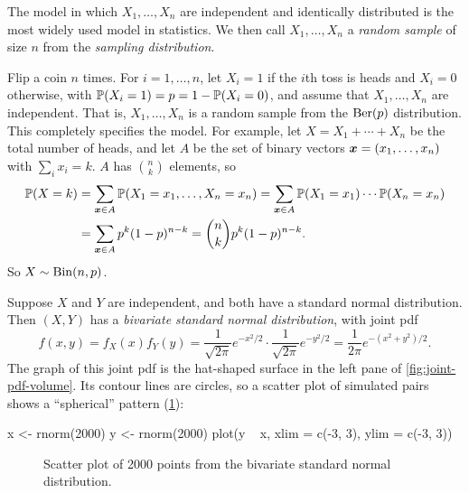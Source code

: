 \begin{remark}\label{rem:random-sample}
The model in which $X_1, \ldots, X_n$ are independent and identically distributed is the most widely used model in statistics. We then call $X_1, \ldots, X_n$ a \emph{random sample} of size $n$ from the \emph{sampling distribution}.
\end{remark}

\begin{example}\label{ex:coin-flips-independent}
Flip a coin $n$ times. For $i = 1, \ldots, n$, let $X_i = 1$ if the $i$th toss is heads and $X_i = 0$ otherwise, with $\mathbb{P}(X_i = 1) = p = 1 - \mathbb{P}(X_i = 0)$, and assume that $X_1, \ldots, X_n$ are independent. That is, $X_1, \ldots, X_n$ is a random sample from the $\mathrm{Ber}(p)$ distribution. This completely specifies the model. For example, let $X = X_1 + \cdots + X_n$ be the total number of heads, and let $A$ be the set of binary vectors $\bm{x} = (x_1, \ldots, x_n)$ with $\sum_i x_i = k$. $A$ has $\binom{n}{k}$ elements, so
\begin{align*}
  \mathbb{P}(X = k) &= \sum_{\bm{x} \in A} \mathbb{P}(X_1 = x_1, \ldots, X_n = x_n) = \sum_{\bm{x} \in A} \mathbb{P}(X_1 = x_1) \cdots \mathbb{P}(X_n = x_n) \\
  &= \sum_{\bm{x} \in A} p^k (1-p)^{n-k} = \binom{n}{k} p^k (1-p)^{n-k}.
\end{align*}
So $X \sim \mathrm{Bin}(n, p)$.
\end{example}

\begin{example}\label{ex:bivariate-standard-normal}
Suppose $X$ and $Y$ are independent, and both have a standard normal distribution. Then $(X, Y)$ has a \emph{bivariate standard normal distribution}, with joint pdf
\[
  f(x, y) = f_X(x) f_Y(y) = \frac{1}{\sqrt{2\pi}} e^{-x^2/2} \cdot \frac{1}{\sqrt{2\pi}} e^{-y^2/2} = \frac{1}{2\pi} e^{-(x^2 + y^2)/2}.
\]
The graph of this joint pdf is the hat-shaped surface in the left pane of \cref{fig:joint-pdf-volume}. Its contour lines are circles, so a scatter plot of simulated pairs shows a ``spherical'' pattern (\cref{fig:bivariate-normal-scatter}):
\begin{rcode}
x <- rnorm(2000)
y <- rnorm(2000)
plot(y ~ x, xlim = c(-3, 3), ylim = c(-3, 3))
\end{rcode}
\end{example}

\begin{figure}[H]
\centering
{}
\caption{Scatter plot of 2000 points from the bivariate standard normal distribution.}
\label{fig:bivariate-normal-scatter}
\end{figure}

